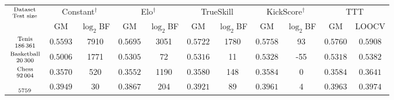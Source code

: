 \documentclass[a4paper,10pt]{book}
\newcommand\hfrac[2]{\genfrac{}{}{0pt}{}{#1}{#2}} %
\theoremstyle{definition}
\newif\ifen
\newif\ifes
\newcommand{\en}[1]{\ifen#1\fi}
\newcommand{\es}[1]{\ifes#1\fi}
\begin{document}
\begin{table}[ht!] \centering
  \scriptsize
  \begin{tabular}{c|cc|cc|cc|cc|c||c} 
 \multirow{2}{*}{$\hfrac{\text{\scriptsize Dataset}}{\text{Test size}}$} & \multicolumn{2}{c|}{Constant\es{e}$^\dagger$}& \multicolumn{2}{c|}{Elo$^\dagger$} & \multicolumn{2}{c|}{TrueSkill} & \multicolumn{2}{c|}{KickScore$^\dagger$} &  \multicolumn{2}{c}{TTT} \\
 & GM & $\log_2$BF & GM & $\log_2$BF & GM & $\log_2$BF & GM & $\log_2$BF & GM & LOOCV \\ \hline
\multirow{2}{*}{$\hfrac{\text{\scriptsize Ten\en{n}is}}{\num{186361}}$} & \multirow{2}{*}{$0.5593$} & \multirow{2}{*}{\num{7910}} & \multirow{2}{*}{$0.5695$} & \multirow{2}{*}{\num{3051}} & \multirow{2}{*}{$0.5722$} & \multirow{2}{*}{\num{1780}} & \multirow{2}{*}{$0.5758$} & \multirow{2}{*}{\num{93}} & \multirow{2}{*}{$\bm{0.5760}$} & \multirow{2}{*}{${0.5908}$} \\
 & & & & & & & & & & \\
 \multirow{2}{*}{$\hfrac{\text{\scriptsize Basketball}}{\num{20300}}$} & \multirow{2}{*}{$0.5006$} & \multirow{2}{*}{\num{1771}} & \multirow{2}{*}{$0.5305$} & \multirow{2}{*}{\num{72}} & \multirow{2}{*}{$0.5316$} & \multirow{2}{*}{\num{11}} & \multirow{2}{*}{$\bm{0.5328}$} & \multirow{2}{*}{-55} & \multirow{2}{*}{${0.5318}$} & \multirow{2}{*}{${0.5382}$} \\
  & & & & & & & & & & \\
 \multirow{2}{*}{$\hfrac{\text{\scriptsize Chess}}{\num{92004}}$} & \multirow{2}{*}{$0.3570$} & \multirow{2}{*}{\num{520}} & \multirow{2}{*}{$0.3552$} & \multirow{2}{*}{\num{1190}} & \multirow{2}{*}{$0.3580$} & \multirow{2}{*}{\num{148}} & \multirow{2}{*}{$\bm{0.3584}$} & \multirow{2}{*}{0} & \multirow{2}{*}{$\bm{0.3584}$} & \multirow{2}{*}{${0.3641}$} \\
 & & & & & & & & & \\
 \multirow{2}{*}{$\hfrac{\text{\scriptsize \en{Football}\es{F\'utbol}}}{\num{5759}}$} & \multirow{2}{*}{$0.3949$} & \multirow{2}{*}{\num{30}} & \multirow{2}{*}{$0.3867$} & \multirow{2}{*}{\num{204}} & \multirow{2}{*}{$0.3921$} & \multirow{2}{*}{\num{89}} & \multirow{2}{*}{$\bm{0.3961}$} & \multirow{2}{*}{\num{4}} & \multirow{2}{*}{$\bm{0.3963}$} &  \multirow{2}{*}{${0.3974}$} \\
  & & & & & & & & & & \\ \hline
  \end{tabular}
  \caption{
  \en{Comparisons between different models in four databases. }%
}
\end{table}
\end{document}
